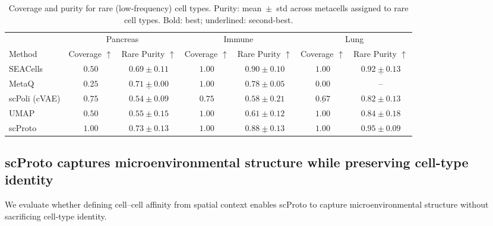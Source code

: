 \begin{table}[t]
\centering
\caption{Coverage and purity for rare (low-frequency) cell types. Purity: mean~$\pm$~std across metacells assigned to rare cell types. Bold: best; underlined: second-best.}
\label{tab:rare_cells}
\tiny
\begin{tabular}{lcc|cc|cc}
\toprule
 & \multicolumn{2}{c}{Pancreas}
 & \multicolumn{2}{c}{Immune}
 & \multicolumn{2}{c}{Lung} \\
\cmidrule(lr){2-3} \cmidrule(lr){4-5} \cmidrule(lr){6-7}
Method
& Coverage $\uparrow$
& Rare Purity $\uparrow$
& Coverage $\uparrow$
& Rare Purity $\uparrow$
& Coverage $\uparrow$
& Rare Purity $\uparrow$ \\
\midrule

SEACells
& $0.50$ & $0.69 \pm 0.11$
& $\mathbf{1.00}$ & $\mathbf{0.90 \pm 0.10}$
& $\mathbf{1.00}$ & $\underline{0.92 \pm 0.13}$ \\

MetaQ
& $0.25$ & $\underline{0.71 \pm 0.00}$
& $\mathbf{1.00}$ & $0.78 \pm 0.05$
& $0.00$ & -- \\

scPoli (cVAE)
& $\underline{0.75}$ & $0.54 \pm 0.09$
& $0.75$ & $0.58 \pm 0.21$
& $\underline{0.67}$ & $0.82 \pm 0.13$ \\

UMAP
& $0.50$ & $0.55 \pm 0.15$
& $\mathbf{1.00}$ & $0.61 \pm 0.12$
& $\mathbf{1.00}$ & $0.84 \pm 0.18$ \\

\midrule

scProto
& $\mathbf{1.00}$ & $\mathbf{0.73 \pm 0.13}$
& $\mathbf{1.00}$ & $\underline{0.88 \pm 0.13}$
& $\mathbf{1.00}$ & $\mathbf{0.95 \pm 0.09}$ \\

\bottomrule
\end{tabular}
\end{table}

\subsection{scProto captures microenvironmental structure while preserving cell-type identity}

We evaluate whether defining cell--cell affinity from spatial context enables scProto to capture microenvironmental structure without sacrificing cell-type identity.

